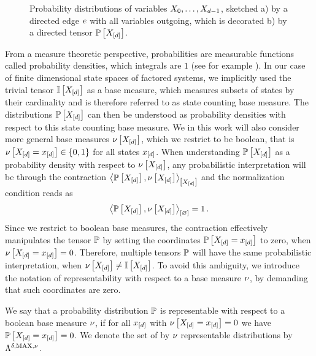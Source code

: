 \begin{figure}[t]
    \begin{center}
        
    \end{center}
    \caption{Probability distributions of variables $X_{0},\ldots,X_{d-1}$, sketched
    a) by a directed edge $e$ with all variables outgoing, which is decorated b) by a directed tensor $\mathbb{P}\left[X_{[d]}\right]$.}\label{fig:probabilityTensor}
\end{figure}


\label{sec:baseMeasure}

From a measure theoretic perspective, probabilities are measurable functions called probability densities, which integrals are $1$ (see for example \cite{degroot_probability_2016}). %
In our case of finite dimensional state spaces of factored systems, we implicitly used the trivial tensor $\mathbb{I}\left[X_{[d]}\right]$ as a base measure, which measures subsets of states by their cardinality and is therefore referred to as state counting base measure.
The distributions $\mathbb{P}\left[X_{[d]}\right]$ can then be understood as probability densities with respect to this state counting base measure.
We in this work will also consider more general base measures $\nu\left[X_{[d]}\right]$, which we restrict to be boolean, that is $\nu\left[X_{[d]}=x_{[d]}\right]\in\{0,1\}$ for all states $x_{[d]}$.
When understanding $\mathbb{P}\left[X_{[d]}\right]$ as a probability density with respect to $\nu\left[X_{[d]}\right]$, any probabilistic interpretation will be through the contraction $\left\langle \mathbb{P}\left[X_{[d]}\right],\nu\left[X_{[d]}\right]\right\rangle_{\left[ X_{[d]} \right]}$ and the normalization condition reads as
\begin{align*}
    \left\langle \mathbb{P}\left[X_{[d]}\right],\nu\left[X_{[d]}\right]\right\rangle_{\left[ \varnothing \right]} = 1 \, .
\end{align*}
Since we restrict to boolean base measures, the contraction effectively manipulates the tensor $\mathbb{P}$ by setting the coordinates $\mathbb{P}\left[X_{[d]}=x_{[d]}\right]$ to zero, when $\nu\left[X_{[d]}=x_{[d]}\right]=0$.
Therefore, multiple tensors $\mathbb{P}$ will have the same probabilistic interpretation, when $\nu\left[X_{[d]}\right]\neq\mathbb{I}\left[X_{[d]}\right]$.
To avoid this ambiguity, we introduce the notation of representability with respect to a base measure $\nu$, by demanding that such coordinates are zero.

\begin{definition}
    \label{def:representationBaseMeasure}
    We say that a probability distribution $\mathbb{P}$ is representable with respect to a boolean base measure $\nu$, if for all $x_{[d]}$ with $\nu\left[X_{[d]}=x_{[d]}\right]=0$ we have $\mathbb{P}\left[X_{[d]}=x_{[d]}\right]=0$.
    We denote the set of by $\nu$ representable distributions by $\Lambda^{\delta,\mathrm{MAX},\nu}$.
\end{definition}

